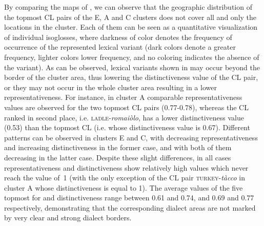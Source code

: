 \documentclass[output=paper]{LSP/langsci}
\begin{document}
By comparing the maps of , we can observe that the geographic distribution of the topmost CL pairs of the E, A and C clusters does not cover all and only the locations in the cluster. Each of them can be seen as a quantitative visualization of individual isoglosses, where darkness of color denotes the frequency of occurrence of the represented lexical variant (dark colors denote a greater frequency, lighter colors lower frequency, and no coloring indicates the absence of the variant). As can be observed, lexical variants shown in  may occur beyond the border of the cluster area, thus lowering the distinctiveness  value of the CL pair, or they may not occur in the whole cluster area resulting in a lower representativeness. For instance, in cluster A comparable representativeness values are observed for the two topmost CL pairs (0.77-0.78), whereas the CL ranked in second place, i.e. \textsc{ladle}{}-\textit{romaiòlo}, has a lower distinctiveness value (0.53) than the topmost CL (i.e. whose distinctiveness value is 0.67). Different patterns can be observed in clusters E and C, with decreasing representativeness and increasing distinctiveness in the former case, and with both of them decreasing in the latter case. Despite these slight differences, in all cases representativeness and distinctiveness show relatively high values which never reach the value of~1 (with the only exception of the CL pair \textsc{turkey}{}-\textit{tàcco} in cluster A whose distinctiveness is equal to 1). The average values of the five topmost  for  and distinctiveness range between 0.61 and 0.74, and 0.69 and 0.77 respectively, demonstrating that the corresponding dialect areas are not marked by very clear and strong dialect borders. 
\end{document}
